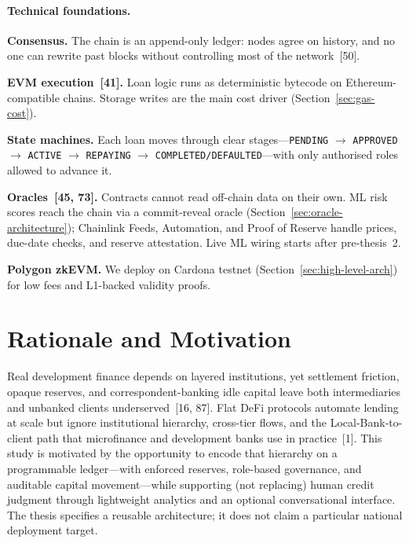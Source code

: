 \documentclass[12pt, a4paper]{report}
\begin{document}
\paragraph{Technical foundations.}
\label{sec:blockchain-fundamentals}

\textbf{Consensus.} The chain is an append-only ledger: nodes agree on history, and no one can rewrite past blocks without controlling most of the network~[50].

\textbf{EVM execution~[41].} Loan logic runs as deterministic bytecode on Ethereum-compatible chains. Storage writes are the main cost driver (Section~\ref{sec:gas-cost}).

\textbf{State machines.} Each loan moves through clear stages---\texttt{PENDING} $\to$ \texttt{APPROVED} $\to$ \texttt{ACTIVE} $\to$ \texttt{REPAYING} $\to$ \texttt{COMPLETED/DEFAULTED}---with only authorised roles allowed to advance it.

\textbf{Oracles~[45, 73].} Contracts cannot read off-chain data on their own. ML risk scores reach the chain via a commit-reveal oracle (Section~\ref{sec:oracle-architecture}); Chainlink Feeds, Automation, and Proof of Reserve handle prices, due-date checks, and reserve attestation. Live ML wiring starts after pre-thesis~2.

\textbf{Polygon zkEVM.} We deploy on Cardona testnet (Section~\ref{sec:high-level-arch}) for low fees and L1-backed validity proofs.

\section{Rationale and Motivation}
\label{sec:rationale}

Real development finance depends on layered institutions, yet settlement friction, opaque reserves, and correspondent-banking idle capital leave both intermediaries and unbanked clients underserved~[16, 87]. Flat DeFi protocols automate lending at scale but ignore institutional hierarchy, cross-tier flows, and the Local-Bank-to-client path that microfinance and development banks use in practice~[1]. This study is motivated by the opportunity to encode that hierarchy on a programmable ledger---with enforced reserves, role-based governance, and auditable capital movement---while supporting (not replacing) human credit judgment through lightweight analytics and an optional conversational interface. The thesis specifies a reusable architecture; it does not claim a particular national deployment target.
\end{document}

